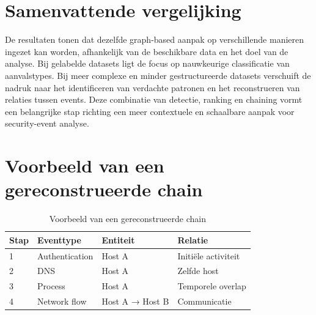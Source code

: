 \section{Samenvattende vergelijking}

De resultaten tonen dat dezelfde graph-based aanpak op verschillende manieren ingezet kan worden, afhankelijk van de beschikbare data en het doel van de analyse.
\newline
\newline
Bij gelabelde datasets ligt de focus op nauwkeurige classificatie van aanvalstypes. Bij meer complexe en minder gestructureerde datasets verschuift de nadruk naar het identificeren van verdachte patronen en het reconstrueren van relaties tussen events.
\newline
\newline
Deze combinatie van detectie, ranking en chaining vormt een belangrijke stap richting een meer contextuele en schaalbare aanpak voor security-event analyse.

\section{Voorbeeld van een gereconstrueerde chain}
\begin{table}[H]
    \centering
    \caption{Voorbeeld van een gereconstrueerde chain}
    \label{tab:example-chain}
    \begin{tabular}{llll}
        \toprule
        Stap & Eventtype & Entiteit & Relatie \\
        \midrule
        1 & Authentication & Host A & Initiële activiteit \\
        2 & DNS & Host A & Zelfde host \\
        3 & Process & Host A & Temporele overlap \\
        4 & Network flow & Host A → Host B & Communicatie \\
        \bottomrule
    \end{tabular}
\end{table}